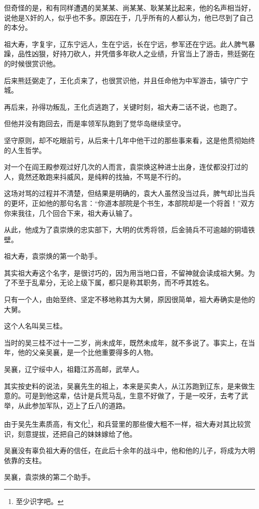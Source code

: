 \begin{multicols}{\theparacolNo}
		但奇怪的是，和有同样遭遇的吴某某、尚某某、耿某某比起来，他的名声相当好，说他是X奸的人，似乎也不多。原因在于，几乎所有的人都认为，他已尽到了自己的本分。

		祖大寿，字复宇，辽东宁远人，生在宁远，长在宁远，参军还在宁远。此人脾气暴躁，品性凶狠，好持刀砍人，并凭借多年砍人之业绩，升官当上了游击，熊廷弼在的时候很赏识他。

		后来熊廷弼走了，王化贞来了，也很赏识他，并且任命他为中军游击，镇守广宁城。

		再后来，孙得功叛乱，王化贞逃跑了，关键时刻，祖大寿二话不说，也跑了。

		但他并没有跑回去，而是率领军队跑到了觉华岛继续坚守。

		坚守原则，却不吃眼前亏，从后来十几年中他干过的那些事来看，这是他贯彻始终的人生哲学。

		对一个在阎王殿参观过好几次的人而言，袁崇焕这种进士出身，连仗都没打过的人，竟然还敢跑来抖威风，是纯粹的找抽，不骂是不行的。

		这场对骂的过程并不清楚，但结果是明确的，袁大人虽然没当过兵，脾气却比当兵的更坏，正如他的那句名言：“你道本部院是个书生，本部院却是一个将首！”双方你来我往，几个回合下来，祖大寿认输了。

		从此，他成为了袁崇焕的忠实部下，大明的优秀将领，后金骑兵不可逾越的铜墙铁壁。

		祖大寿，袁崇焕的第一个助手。

		其实祖大寿这个名字，是很讨巧的，因为用当地口音，不留神就会读成祖大舅。为了不至于乱辈分，无论上级下属，都只是称其职务，而不呼其姓名。

		只有一个人，由始至终、坚定不移地称其为大舅，原因很简单，祖大寿确实是他的大舅。

		这个人名叫吴三桂。

		当时的吴三桂不过十一二岁，尚未成年，既然未成年，就不多说了。事实上，在当年，他的父亲吴襄，是一个比他重要得多的人物。

		吴襄，辽宁绥中人，祖籍江苏高邮，武举人。

		其实按史料的说法，吴襄先生的祖上，本来是买卖人，从江苏跑到辽东，是来做生意的。可是到他这辈，估计是兵荒马乱，生意不好做了，于是一咬牙，去考了武举，从此参加军队，迈上了丘八的道路。

		由于吴先生素质高，有文化\footnote{至少识字吧。}，和兵营里的那些傻大粗不一样，祖大寿对其比较赏识，刻意提拔，还把自己的妹妹嫁给了他。

		吴襄没有辜负祖大寿的信任，在此后十余年的战斗中，他和他的儿子，将成为大明依靠的支柱。

		吴襄，袁崇焕的第二个助手。


\end{multicols}

